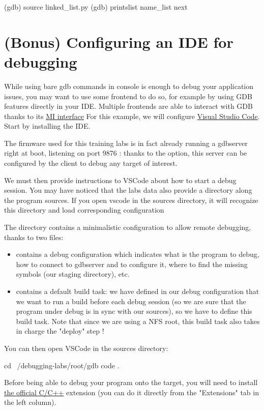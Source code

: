 \begin{bashinput}
(gdb) source linked_list.py
(gdb) printslist name_list next
\end{bashinput}

\section{(Bonus) Configuring an IDE for debugging}

While using bare gdb commands in console is enough to debug your application issues, you
may want to use some frontend to do so, for example by using GDB features directly
in your IDE. Multiple frontends are able to interact with GDB thanks to its
\href{https://sourceware.org/gdb/current/onlinedocs/gdb.html/GDB_002fMI.html}{MI
interface}
For this example, we will configure
\href{https://code.visualstudio.com/}{Visual Studio Code}. Start by installing
the IDE.

The firmware used for this training labs is in fact already running a gdbserver
right at boot, listening on port 9876 : thanks to the  option,
this server can be configured by the client to debug any target of interest.

We must then provide instructions to VSCode about how to start a debug session.
You may have noticed that the labs data also provide a  directory
along the program sources. If you open vscode in the sources directory, it will
recognize this  directory and load corresponding configuration

The  directory contains a minimalistic configuration to allow
remote debugging, thanks to two files:
\begin{itemize}
  \item {} contains a debug configuration which indicates what
  is the program to debug, how to connect to gdbserver and to configure it, where to
  find the missing symbols (our staging directory), etc.
  \item {} contains a default build task: we have defined in our
  debug configuration that we want to run a build before each debug session (so
  we are sure that the program under debug is in sync with our sources), so
  we have to define this build task. Note that since we are using a NFS root,
  this build task also takes in charge the "deploy" step !
\end{itemize}

You can then open VSCode in the sources directory:
\begin{bashinput}
  cd ~/debugging-labs/root/gdb
  code .
\end{bashinput}
Before being able to debug your program onto the target, you will need to install
\href{https://marketplace.visualstudio.com/items?itemName=ms-vscode.cpptools}{the
official C/C++} extension (you can do it directly from the "Extensions" tab in
the left column).

